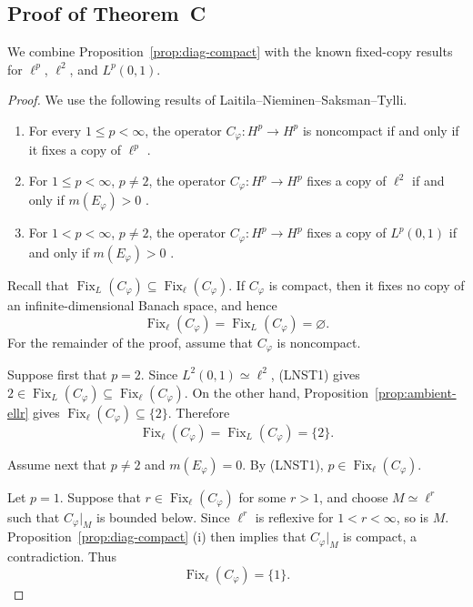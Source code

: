 \documentclass[11pt, reqno]{amsart}
\theoremstyle{definition}
\theoremstyle{remark}
\begin{document}
\subsection{Proof of Theorem~C}

We combine
Proposition~\ref{prop:diag-compact}
with the known fixed-copy results for \(\ell^p\), \(\ell^2\), and
\(L^p(0,1)\).

\begin{proof}
We use the following results of
Laitila--Nieminen--Saksman--Tylli.
\begin{enumerate}[label=\textup{(LNST\arabic*)},leftmargin=*]
\item For every \(1\le p<\infty\), the operator
\(C_\varphi:H^p\to H^p\) is noncompact if and only if it fixes a
copy of \(\ell^p\)
\cite[Theorem~1.2]{LNST2017}.

\item For \(1\le p<\infty\), \(p\ne2\), the operator
\(C_\varphi:H^p\to H^p\) fixes a copy of \(\ell^2\) if and only if
\(m(E_\varphi)>0\)
\cite[Theorem~1.4]{LNST2017}.

\item For \(1<p<\infty\), \(p\ne2\), the operator
\(C_\varphi:H^p\to H^p\) fixes a copy of \(L^p(0,1)\) if and only if
\(m(E_\varphi)>0\)
\cite[Theorem~1.5]{LNST2017}.
\end{enumerate}

Recall that
\(\operatorname{Fix}_{L}(C_\varphi)
\subseteq\operatorname{Fix}_{\ell}(C_\varphi)\).
If \(C_\varphi\) is compact, then it fixes no copy of an
infinite-dimensional Banach space, and hence
\[
        \operatorname{Fix}_{\ell}(C_\varphi)
        =
        \operatorname{Fix}_{L}(C_\varphi)
        =
        \varnothing.
\]
For the remainder of the proof, assume that \(C_\varphi\) is
noncompact.

Suppose first that \(p=2\). Since
\(L^2(0,1)\simeq\ell^2\), \textup{(LNST1)} gives
\(2\in\operatorname{Fix}_{L}(C_\varphi)
\subseteq\operatorname{Fix}_{\ell}(C_\varphi)\).
On the other hand,
Proposition~\ref{prop:ambient-ellr} gives
\(\operatorname{Fix}_{\ell}(C_\varphi)\subseteq\{2\}\).
Therefore
\[
        \operatorname{Fix}_{\ell}(C_\varphi)
        =
        \operatorname{Fix}_{L}(C_\varphi)
        =
        \{2\}.
\]

Assume next that \(p\ne2\) and \(m(E_\varphi)=0\).
By \textup{(LNST1)},
\(p\in\operatorname{Fix}_{\ell}(C_\varphi)\).

Let \(p=1\). Suppose that
\(r\in\operatorname{Fix}_{\ell}(C_\varphi)\) for some \(r>1\),
and choose \(M\simeq\ell^r\) such that \(C_\varphi|_M\) is bounded
below. Since \(\ell^r\) is reflexive for \(1<r<\infty\), so is \(M\).
Proposition~\ref{prop:diag-compact}%
\textup{(i)} then implies that \(C_\varphi|_M\) is compact, a
contradiction. Thus
\[
        \operatorname{Fix}_{\ell}(C_\varphi)=\{1\}.
\]


\end{proof}
\end{document}
